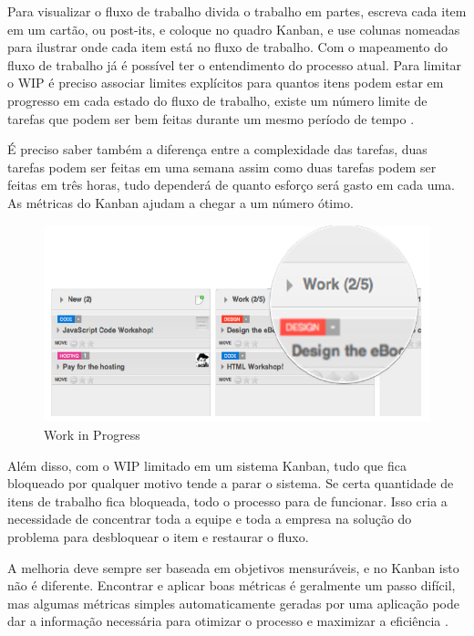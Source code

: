 Para visualizar o fluxo de trabalho divida o trabalho em partes, escreva cada item em um cartão, ou post-its, e coloque no quadro Kanban, e use colunas nomeadas para ilustrar onde cada item está no fluxo de trabalho. Com o mapeamento do fluxo de trabalho já é possível ter o entendimento do processo atual. 
Para limitar o WIP é preciso associar limites explícitos para quantos itens podem estar em progresso em cada estado do fluxo de trabalho, existe um número limite de tarefas que podem ser bem feitas durante um mesmo período de tempo \cite{klipp}. 

É preciso saber também a diferença entre a complexidade das tarefas, duas tarefas podem ser feitas em uma semana assim como duas tarefas podem ser feitas em três horas, tudo dependerá de quanto esforço será gasto em cada uma. As métricas do Kanban ajudam a chegar a um número ótimo.

\begin{figure}[h]
		\centering
		\label{fig05}
			\includegraphics[scale=0.5]{figuras/WIP.png}
		\caption{Work in Progress  \cite{klipp}}
\end{figure}


Além disso, com o WIP limitado em um sistema Kanban, tudo que fica bloqueado por qualquer motivo tende a parar o sistema. Se certa quantidade de itens de trabalho fica bloqueada, todo o processo para de funcionar. Isso cria a necessidade de concentrar toda a equipe e toda a empresa na solução do problema para desbloquear o item e restaurar o fluxo. 

A melhoria deve sempre ser baseada em objetivos mensuráveis, e no Kanban isto não é diferente. Encontrar e aplicar boas métricas é geralmente um passo difícil,  mas algumas métricas simples automaticamente geradas por uma aplicação pode dar a informação necessária para otimizar o processo e maximizar a eficiência \cite{klipp}. 

